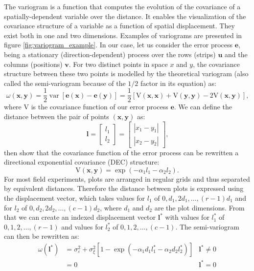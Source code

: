 The variogram is a function that computes the evolution of the covariance of a spatially-dependent variable over the distance.
It enables the visualization of the covariance structure of a variable as a function of spatial displacement. They exist both in one and two dimensions. Examples of variograms are presented in figure \ref{fig:variogram_example}. In our case, let us consider the error process $\mathbf{e}$, being a stationary (direction-dependent) process over the rows (strips) $\mathbf{u}$ and the columns (positions) $\mathbf{v}$. For two distinct points in space $x$ and $y$, the covariance structure between these two points is modelled by the theoretical variogram (also called the semi-variogram because of the $1/2$ factor in its equation) as:
\begin{equation}
    \omega(\mathbf{x}, \mathbf{y})=\frac{1}{2} \operatorname{var}[\mathbf{e}(\mathbf{x})-\mathbf{e}(\mathbf{y})]=\frac{1}{2}
    [\mathrm{V}(\mathbf{x}, \mathbf{x})+\mathrm{V}(\mathbf{y}, \mathbf{y})-2 \mathrm{V}(\mathbf{x}, \mathbf{y})]
    \text{,}
\end{equation}
where $\mathrm{V}$ is the covariance function of our error process $\mathbf{e}$. We can define the distance between the pair of points $(\mathbf{x},\mathbf{y})$ as:
\begin{equation*}
    \mathbf{l}=\left[ \begin{array}{l}{l_{1}} \\ {l_{2}}\end{array}\right]=\left[ \begin{array}{l}{\left|x_{1}-y_{1}\right|} \\ 
    {\left|x_{2}-y_{2}\right|}\end{array}\right]
    \text{,}
\end{equation*}
then \textcite{zimmerman_random_1991} show that the covariance function of the error process can be rewritten a directional exponential covariance (DEC) structure:
\begin{equation}
	\mathrm{V}(\mathbf{x},\mathbf{y}) = \operatorname{exp}(-\alpha_{1}l_{1} - \alpha_{2}l_{2})
	\text{.}
\end{equation}
For most field experiments, plots are arranged in regular grids and thus separated by equivalent distances. Therefore the distance between plots is expressed using the displacement vector, which takes values for $l_1$ of $0,d_1,2d_1,\ldots,(r-1)d_1$ and for $l_2$ of $0,d_2,2d_2,\ldots,(c-1)d_2$, where $d_1$ and $d_2$ are the plot dimensions. 
From that we can create an indexed displacement vector $\mathbf{l}^{*}$ with values for $l_1^*$ of $0,1,2,\ldots,(r-1)$ and values for $l_2^*$ of $0,1,2,\ldots,(c-1)$.
The semi-variogram can then be rewritten as:
\begin{equation}
    \begin{aligned}
        \omega\left(\mathbf{l}^{*}\right) & = \sigma_{\varepsilon}^{2}+\sigma_{\xi}^{2}\left[1-\exp \left(-\alpha_{1} d_{1} 
        l_{1}^{*} - \alpha_{2} d_{2} l_{2}^{*} \right) \right] 
        &  \mathbf{l}^* \neq 0 \\
        & = 0
        & \mathbf{l}^* = 0 
    \end{aligned}
    \label{eq:variogram_DEC}
\end{equation}

